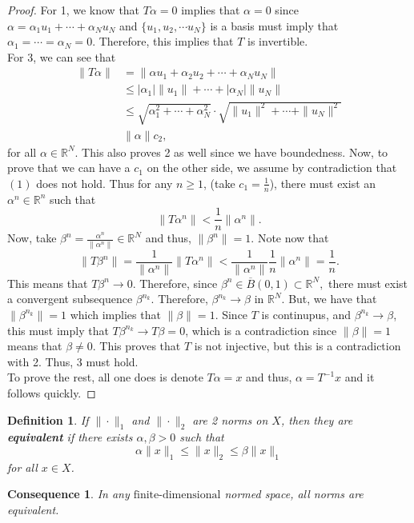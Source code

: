 \documentclass[12pt]{article}
\newtheorem{definition}{Definition}
\newtheorem{cons}{Consequence}
\newcommand{\R}{{\mathbb R}}
\newcommand{\fd}{{\text{finite-dimensional}}}
\newcommand{\sbs}{\subset}
\begin{document}
\begin{proof}
For 1, we know that $T\alpha = 0$ implies that $\alpha = 0$ since $\alpha = \alpha_1 u_1 + \cdots + \alpha_N u_N$ and $\{u_1, u_2, \cdots u_N\}$ is a basis must imply that $\alpha_1 = \cdots = \alpha_N = 0$. Therefore, this implies that $T$ is invertible. \\
For 3, we can see that 
\begin{align*}
\| T \alpha \| & = \| \alpha u_1 + \alpha_2  u_2 + \cdots + \alpha_N u_N \| \\
& \leq |\alpha_1| \| u_1 \| + \cdots + |\alpha_N| \| u_N \| \\
& \leq \sqrt{\alpha_1^2 + \cdots + \alpha_N^2} \cdot \sqrt{\| u_1 \|^2 + \cdots + \| u_N \|^2}\\
& \| \alpha \| c_2,
\end{align*}
for all $\alpha \in \R^N$. This also proves 2 as well since we have boundedness. Now, to prove that we can have a $c_1$ on the other side, we assume by contradiction that $(1)$ does not hold. Thus for any $n \geq 1$, (take $c_1 = \frac{1}{n}$), there must exist an $\alpha^n \in \R^n$ such that 
\[ \| T \alpha^n \| < \frac{1}{n} \| \alpha^n \|.\]
Now, take $\beta^n = \frac{\alpha^n}{\| \alpha^n \|} \in \R^N$ and thus, $\| \beta^n \| = 1$. Note now that 
\[ \| T \beta^n \| = \frac{1}{\| \alpha^n \| } \| T \alpha^n \| < \frac{1}{\| \alpha^n \|} \frac{1}{n} \| \alpha^n \| = \frac{1}{n}.\]
This means that $T \beta^n \to 0$. Therefore, since $\beta^n \in \overline{B}(0, 1) \sbs \R^N,$ there must exist a convergent subsequence $\beta^{n_k}$. Therefore, $\beta^{n_k} \to \beta$ in $\R^N$. But, we have that $\| \beta^{n_k} \| = 1$ which implies that $\| \beta \| = 1$. Since $T$ is continupus, and $\beta^{n_k} \to \beta$, this must imply that $T\beta^{n_k} \to T \beta = 0$, which is a contradiction since $\| \beta \| = 1$ means that $\beta \neq 0$. This proves that $T$ is not injective, but this is a contradiction with 2. Thus, 3 must hold. \\
To prove the rest, all one does is denote $T\alpha = x$ and thus, $\alpha = T^{-1} x$ and it follows quickly. 
\end{proof}
\begin{definition}
If $\| \cdot \|_1$ and $\| \cdot \|_2$ are 2 norms on $X$, then they are \textbf{equivalent} if there exists $\alpha, \beta > 0$ such that
\[ \alpha \| x \|_1 \leq \| x \|_2 \leq \beta \| x \|_1\]
for all $x\in X$. 
\end{definition}
\begin{cons}
In any $\fd$ normed space, all norms are equivalent.
\end{cons}
\end{document}
